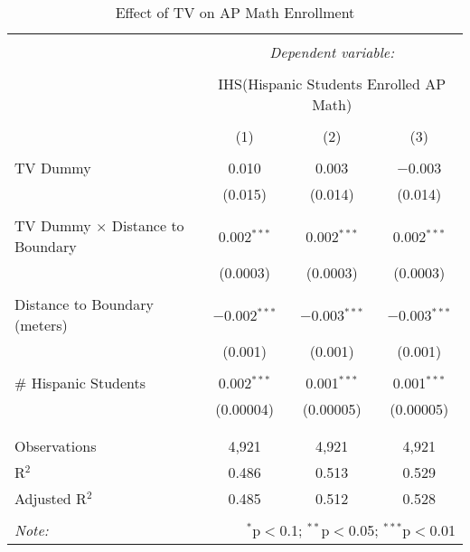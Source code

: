 
\begin{table}[!htbp] \centering 
  \caption{Effect of TV on AP Math Enrollment} 
  \label{} 
\begin{tabular}{@{\extracolsep{-2pt}}lccc} 
\\[-1.8ex]\hline 
\hline \\[-1.8ex] 
 & \multicolumn{3}{c}{\textit{Dependent variable:}} \\ 
\cline{2-4} 
\\[-1.8ex] & \multicolumn{3}{c}{IHS(Hispanic Students Enrolled AP Math)} \\ 
\\[-1.8ex] & (1) & (2) & (3)\\ 
\hline \\[-1.8ex] 
 TV Dummy & 0.010 & 0.003 & $-$0.003 \\ 
  & (0.015) & (0.014) & (0.014) \\ 
  & & & \\ 
 TV Dummy $\times$ Distance to Boundary & 0.002$^{***}$ & 0.002$^{***}$ & 0.002$^{***}$ \\ 
  & (0.0003) & (0.0003) & (0.0003) \\ 
  & & & \\ 
 Distance to Boundary (meters) & $-$0.002$^{***}$ & $-$0.003$^{***}$ & $-$0.003$^{***}$ \\ 
  & (0.001) & (0.001) & (0.001) \\ 
  & & & \\ 
 \# Hispanic Students & 0.002$^{***}$ & 0.001$^{***}$ & 0.001$^{***}$ \\ 
  & (0.00004) & (0.00005) & (0.00005) \\ 
  & & & \\ 
\hline \\[-1.8ex] 
Observations & 4,921 & 4,921 & 4,921 \\ 
R$^{2}$ & 0.486 & 0.513 & 0.529 \\ 
Adjusted R$^{2}$ & 0.485 & 0.512 & 0.528 \\ 
\hline 
\hline \\[-1.8ex] 
\textit{Note:}  & \multicolumn{3}{r}{$^{*}$p$<$0.1; $^{**}$p$<$0.05; $^{***}$p$<$0.01} \\ 
\end{tabular} 
\end{table} 
